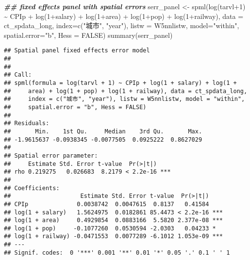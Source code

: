 \documentclass[
]{article}
\newenvironment{Shaded}{\begin{snugshade}}{\end{snugshade}}
\newcommand{\AttributeTok}[1]{\textcolor[rgb]{0.77,0.63,0.00}{#1}}
\newcommand{\ConstantTok}[1]{\textcolor[rgb]{0.00,0.00,0.00}{#1}}
\newcommand{\DecValTok}[1]{\textcolor[rgb]{0.00,0.00,0.81}{#1}}
\newcommand{\DocumentationTok}[1]{\textcolor[rgb]{0.56,0.35,0.01}{\textbf{\textit{#1}}}}
\newcommand{\FunctionTok}[1]{\textcolor[rgb]{0.00,0.00,0.00}{#1}}
\newcommand{\NormalTok}[1]{#1}
\newcommand{\OtherTok}[1]{\textcolor[rgb]{0.56,0.35,0.01}{#1}}
\newcommand{\SpecialCharTok}[1]{\textcolor[rgb]{0.00,0.00,0.00}{#1}}
\newcommand{\StringTok}[1]{\textcolor[rgb]{0.31,0.60,0.02}{#1}}
\begin{document}
\begin{Shaded}
\begin{Highlighting}[]
\DocumentationTok{\#\# fixed effects panel with spatial errors}
\NormalTok{serr\_panel }\OtherTok{\textless{}{-}} \FunctionTok{spml}\NormalTok{(}\FunctionTok{log}\NormalTok{(tarvl}\SpecialCharTok{+}\DecValTok{1}\NormalTok{) }\SpecialCharTok{\textasciitilde{}}\NormalTok{ CPIp }\SpecialCharTok{+}
                \FunctionTok{log}\NormalTok{(}\DecValTok{1}\SpecialCharTok{+}\NormalTok{salary) }\SpecialCharTok{+}
                \FunctionTok{log}\NormalTok{(}\DecValTok{1}\SpecialCharTok{+}\NormalTok{area) }\SpecialCharTok{+} \FunctionTok{log}\NormalTok{(}\DecValTok{1}\SpecialCharTok{+}\NormalTok{pop) }\SpecialCharTok{+}
                \FunctionTok{log}\NormalTok{(}\DecValTok{1}\SpecialCharTok{+}\NormalTok{railway),}
               \AttributeTok{data =}\NormalTok{ ct\_spdata\_long,}
               \AttributeTok{index=}\FunctionTok{c}\NormalTok{(}\StringTok{"城市"}\NormalTok{, }\StringTok{"year"}\NormalTok{),}
               \AttributeTok{listw =}\NormalTok{ W5nnlistw,}
               \AttributeTok{model=}\StringTok{"within"}\NormalTok{, }
               \AttributeTok{spatial.error=}\StringTok{"b"}\NormalTok{, }
               \AttributeTok{Hess =} \ConstantTok{FALSE}\NormalTok{)}
\FunctionTok{summary}\NormalTok{(serr\_panel)}
\end{Highlighting}
\end{Shaded}

\begin{verbatim}
## Spatial panel fixed effects error model
##  
## 
## Call:
## spml(formula = log(tarvl + 1) ~ CPIp + log(1 + salary) + log(1 + 
##     area) + log(1 + pop) + log(1 + railway), data = ct_spdata_long, 
##     index = c("城市", "year"), listw = W5nnlistw, model = "within", 
##     spatial.error = "b", Hess = FALSE)
## 
## Residuals:
##       Min.    1st Qu.     Median    3rd Qu.       Max. 
## -1.9615637 -0.0938345 -0.0077505  0.0925222  0.8627029 
## 
## Spatial error parameter:
##     Estimate Std. Error t-value  Pr(>|t|)    
## rho 0.219275   0.026683  8.2179 < 2.2e-16 ***
## 
## Coefficients:
##                    Estimate Std. Error t-value  Pr(>|t|)    
## CPIp              0.0038742  0.0047615  0.8137   0.41584    
## log(1 + salary)   1.5624975  0.0182861 85.4473 < 2.2e-16 ***
## log(1 + area)     0.4929854  0.0883166  5.5820 2.377e-08 ***
## log(1 + pop)     -0.1077260  0.0530594 -2.0303   0.04233 *  
## log(1 + railway) -0.0471553  0.0077289 -6.1012 1.053e-09 ***
## ---
## Signif. codes:  0 '***' 0.001 '**' 0.01 '*' 0.05 '.' 0.1 ' ' 1
\end{verbatim}
\end{document}
